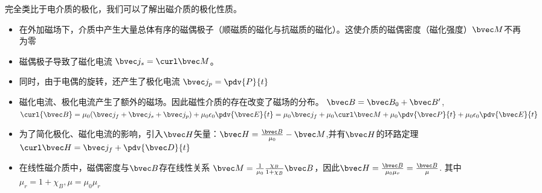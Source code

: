 
完全类比于电介质的极化，我们可以了解出磁介质的极化性质。

\begin{itemize}
\item 在外加磁场下，介质中产生大量总体有序的磁偶极子（顺磁质的磁化与抗磁质的磁化）。这使介质的磁偶密度（磁化强度）$\bvec M$不再为零

\item 磁偶极子导致了磁化电流 $\bvec j_s = \curl \bvec M$。
\item 同时，由于电偶的旋转，还产生了极化电流 $\bvec j_p = \pdv{P}{t}$  %

\item 磁化电流、极化电流产生了额外的磁场。因此磁性介质的存在改变了磁场的分布。 $\bvec B = \bvec B_0 + \bvec B'$, $\curl {\bvec B} = \mu_0 (\bvec j_f + \bvec j_s + \bvec j_p) + \mu_0\epsilon_0 \pdv{\bvec E}{t} = \mu_0 \bvec j_f + \mu_0 \curl \bvec M + \mu_0 \pdv{\bvec P}{t} + \mu_0 \epsilon_0 \pdv{\bvec E}{t}$

\item 为了简化极化、磁化电流的影响，引入$\bvec H$矢量：$\bvec H = \frac{\bvec B}{\mu_0} - \bvec M$,并有$\bvec H$的环路定理 $\curl \bvec H = \bvec j_f + \pdv{\bvec D}{t}$

\item 在线性磁介质中，磁偶密度与$\bvec B$存在线性关系  $\bvec M = \frac{1}{\mu_0} \frac{\chi_B}{1+\chi_B}\bvec B$，因此$\bvec H = \frac{\bvec B}{\mu_0\mu_r}= \frac{\bvec B}{\mu}$. 其中$\mu_r = 1+\chi_B,  \mu = \mu_0 \mu_r$
\end{itemize}